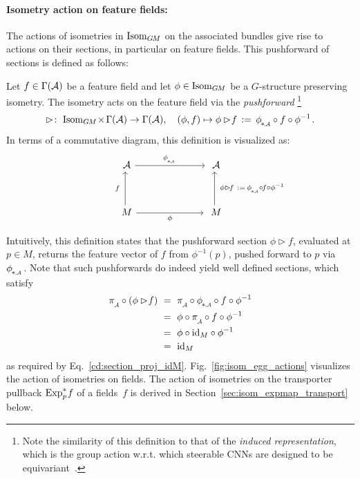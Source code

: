 \paragraph{Isometry action on feature fields:}
The actions of isometries in $\operatorname{Isom}_{G\mkern-1.4muM}$ on the associated bundles give rise to actions on their sections, in particular on feature fields.
This pushforward of sections is defined as follows:
\begin{dfn}
\label{dfn:isometry_pushforward}
    Let $f\in \Gamma(\mathcal{A})$ be a feature field and let $\phi\in \operatorname{Isom}_{G\mkern-1.4muM}$ be a $G$-structure preserving isometry.
    The isometry acts on the feature field via the \emph{pushforward}%
    \footnote{
        Note the similarity of this definition to that of the \emph{induced representation}, which is the group action w.r.t. which steerable CNNs are designed to be equivariant~\cite{Cohen2017-STEER,3d_steerableCNNs,Weiler2019_E2CNN}.
    }
    \begin{align}\label{eq:pushforward_section_A}
        \rhd\!:\ \IsomGM \mkern-2mu\times\mkern2mu \Gamma(\A) \to \Gamma(\A), \quad
        (\phi,f) \mapsto \phi\rhd\!f \,:=\, \dphiA\! \circ f \circ \phiinv \,.
    \end{align}
    In terms of a commutative diagram, this definition is visualized as:
    \begin{equation}\label{cd:pushforward_section_A}
    \qquad\qquad
    \begin{tikzcd}[column sep=70pt, row sep=35, font=\normalsize]
        \A
            \arrow[r, "\dphiA"]
        &
        \A
        \\
        M
            \arrow[r, "\phi"']
            \arrow[u, "f\ "]
        &
        M
            \arrow[u, "\ \phi\rhd\!f\ :=\: \dphiA \!\circ\mkern-2mu f \circ \phiinv"']
    \end{tikzcd}
    \end{equation}
\end{dfn}
Intuitively, this definition states that the pushforward section $\phi\rhd\!f$, evaluated at $p\in M$, returns the feature vector of $f$ from $\phi^{-1}(p)$, pushed forward to $p$ via $\dphiA$.
Note that such pushforwards do indeed yield well defined sections, which satisfy
\begin{align}
    \piA \circ (\phi\rhd \!f)
    \ &=\ \piA \circ \dphiA\! \circ f \circ \phiinv \notag \\
    \ &=\ \phi \circ \piA \circ f \circ \phiinv \notag \\
    \ &=\ \phi \circ \id_M \circ \phiinv \notag \\
    \ &=\ \id_M
\end{align}
as required by Eq.~\eqref{cd:section_proj_idM}.
Fig.~\ref{fig:isom_egg_actions} visualizes the action of isometries on fields.
The action of isometries on the transporter pullback $\operatorname{Exp}^*_p\mkern-2mu f$ of a fields~$f$ is derived in Section~\ref{sec:isom_expmap_transport} below.

















